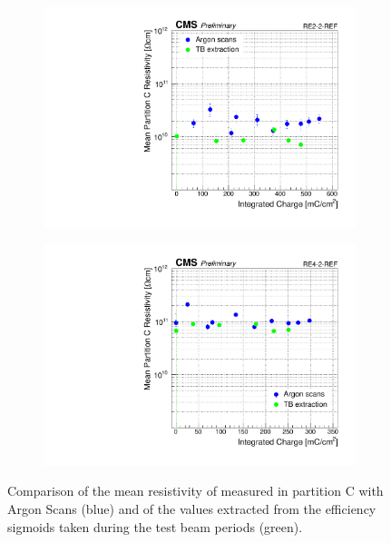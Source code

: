 \begin{figure}[H]
\begin{subfigure}{0.5\linewidth}
        	\caption{\label{fig:Resistivity-extract:B}}
    	\end{subfigure}
    	\begin{subfigure}{0.5\linewidth}
			\centering
    		\includegraphics[width = \linewidth]{fig/chapt5/Extract-Res_vs_time_RE2-2-REF.pdf}
        	\caption{\label{fig:Resistivity-extract:C}}
    	\end{subfigure}
    	\begin{subfigure}{0.5\linewidth}
			\centering
    		\includegraphics[width = \linewidth]{fig/chapt5/Extract-Res_vs_time_RE4-2-REF.pdf}
        	\caption{\label{fig:Resistivity-extract:D}}
    	\end{subfigure}
		\caption{\label{fig:Resistivity-extract} Comparison of the mean resistivity of measured in partition C with Argon Scans (blue) and of the values extracted from the efficiency sigmoids taken during the test beam periods (green).}
	\end{figure}
	
